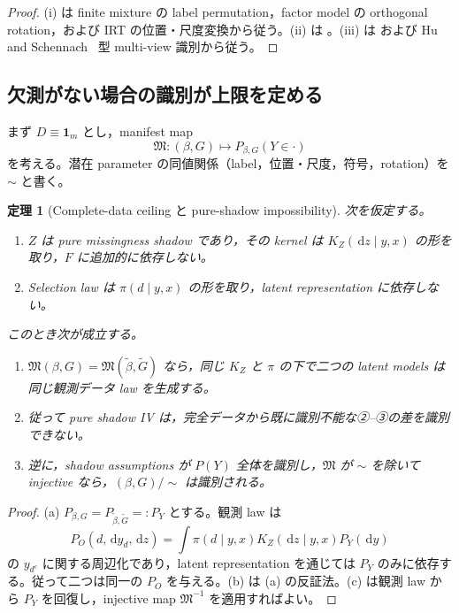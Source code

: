 \documentclass[11pt,a4paper]{ltjsarticle}
\newtheorem{theorem}{定理}[section]
\theoremstyle{remark}
\newcommand{\one}{\bm 1}
\newcommand{\dd}{\,\mathrm d}
\newcommand{\wt}{\widetilde}
\begin{document}
\begin{proof}
(i) は finite mixture の label permutation，factor model の orthogonal rotation，および IRT の位置・尺度変換から従う。(ii) は 。(iii) は  および Hu and Schennach~\cite{HuSchennach2008} 型 multi-view 識別から従う。
\end{proof}

\subsection{欠測がない場合の識別が上限を定める}

まず $D\equiv\one_m$ とし，manifest map
\[
 \mathfrak M:(\beta,G)\longmapsto P_{\beta,G}(Y\in\cdot)
\]
を考える。潜在 parameter の同値関係（label，位置・尺度，符号，rotation）を $\sim$ と書く。

\begin{theorem}[Complete-data ceiling と pure-shadow impossibility]
\label{thm:completedataceiling}
次を仮定する。
\begin{enumerate}[label=(\roman*)]
\item $Z$ は pure missingness shadow であり，その kernel は $K_Z(\dd z\mid y,x)$ の形を取り，$F$ に追加的に依存しない。
\item Selection law は $\pi(d\mid y,x)$ の形を取り，latent representation に依存しない。
\end{enumerate}
このとき次が成立する。
\begin{enumerate}[label=(\alph*)]
\item $\mathfrak M(\beta,G)=\mathfrak M(\wt\beta,\wt G)$ なら，同じ $K_Z$ と $\pi$ の下で二つの latent models は同じ観測データ law を生成する。
\item 従って pure shadow IV は，完全データから既に識別不能な②--③の差を識別できない。
\item 逆に，shadow assumptions が $P(Y)$ 全体を識別し，$\mathfrak M$ が $\sim$ を除いて injective なら，$(\beta,G)/{\sim}$ は識別される。
\end{enumerate}
\end{theorem}

\begin{proof}
(a) $P_{\beta,G}=P_{\wt\beta,\wt G}=:P_Y$ とする。観測 law は
\[
 P_O(d,\dd y_d,\dd z)
 =\int \pi(d\mid y,x)K_Z(\dd z\mid y,x)P_Y(\dd y)
\]
の $y_{d^c}$ に関する周辺化であり，latent representation を通じては $P_Y$ のみに依存する。従って二つは同一の $P_O$ を与える。(b) は (a) の反証法。(c) は観測 law から $P_Y$ を回復し，injective map $\mathfrak M^{-1}$ を適用すればよい。
\end{proof}
\end{document}
